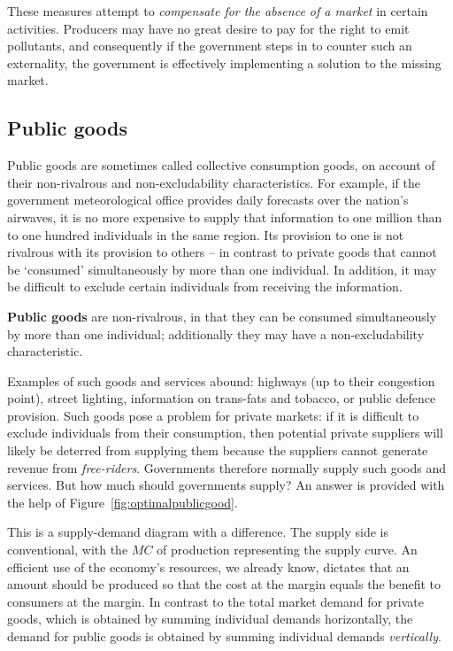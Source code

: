 These measures attempt to \textit{compensate for the absence of a market} in certain activities. Producers may have no great desire to pay for the right to emit pollutants, and consequently if the government steps in to counter such an externality, the government is effectively implementing a solution to the missing market. 

\subsection*{Public goods}

Public goods are sometimes called collective consumption goods, on account of their non-rivalrous and non-excludability characteristics. For example, if the government meteorological office provides daily forecasts over the nation's airwaves, it is no more expensive to supply that information to one million than to one hundred individuals in the same region. Its provision to one is not rivalrous with its provision to others -- in contrast to private goods that cannot be `consumed' simultaneously by more than one individual. In addition, it may be difficult to exclude certain individuals from receiving the information.

\begin{DefBox}
\textbf{Public goods} are non-rivalrous, in that they can be consumed simultaneously by more than one individual; additionally they may have a non-excludability characteristic.
\end{DefBox}

Examples of such goods and services abound: highways (up to their congestion point), street lighting, information on trans-fats and tobacco, or public defence provision.  Such goods pose a problem for private markets: if it is difficult to exclude individuals from their consumption, then potential private suppliers will likely be deterred from supplying them because the suppliers cannot generate revenue from \textit{free-riders}. Governments therefore normally supply such goods and services. But how much should governments supply? An answer is provided with the help of Figure~\ref{fig:optimalpublicgood}.



This is a supply-demand diagram with a difference. The supply side is conventional, with the $MC$ of production representing the supply curve. An efficient use of the economy's resources, we already know, dictates that an amount should be produced so that the cost at the margin equals the benefit to consumers at the margin. In contrast to the total market demand for private goods, which is obtained by summing individual demands horizontally, the demand for public goods is obtained by summing individual demands \textit{vertically}.

